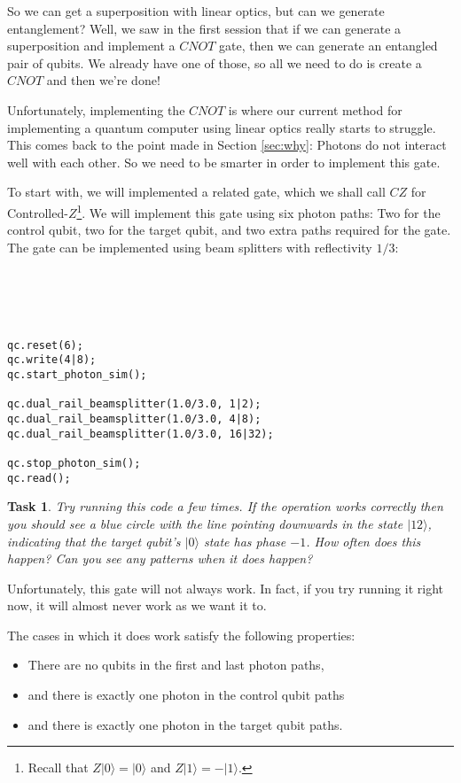 \documentclass[twocolumn]{article}
\newtheorem{task}{Task}[section]
\begin{document}
So we can get a superposition with linear optics, but can we generate entanglement? Well, we saw in the first session that if we can generate a superposition and implement a $CNOT$ gate, then we can generate an entangled pair of qubits. We already have one of those, so all we need to do is create a $CNOT$ and then we're done!

Unfortunately, implementing the $CNOT$ is where our current method for implementing a quantum computer using linear optics really starts to struggle. This comes back to the point made in Section \ref{sec:why}: Photons do not interact well with each other. So we need to be smarter in order to implement this gate.

To start with, we will implemented a related gate, which we shall call $CZ$ for Controlled-$Z$\footnote{Recall that $Z|0\rangle = |0\rangle$ and $Z|1\rangle = -|1\rangle$.}. We will implement this gate using six photon paths: Two for the control qubit, two for the target qubit, and two extra paths required for the gate. The gate can be implemented using beam splitters with reflectivity $1/3$:
\\\\\\\\\\
\begin{lstlisting}
qc.reset(6);
qc.write(4|8);
qc.start_photon_sim();

qc.dual_rail_beamsplitter(1.0/3.0, 1|2);
qc.dual_rail_beamsplitter(1.0/3.0, 4|8);
qc.dual_rail_beamsplitter(1.0/3.0, 16|32);

qc.stop_photon_sim();
qc.read();
\end{lstlisting}

\begin{task}
Try running this code a few times. If the operation works correctly then you should see a blue circle with the line pointing downwards in the state $|12\rangle$, indicating that the target qubit's $|0\rangle$ state has phase $-1$. How often does this happen? Can you see any patterns when it does happen?
\end{task}

Unfortunately, this gate will not always work. In fact, if you try running it right now, it will almost never work as we want it to.

The cases in which it does work satisfy the following properties:

\begin{itemize}
\item There are no qubits in the first and last photon paths,
\item and there is exactly one photon in the control qubit paths
\item and there is exactly one photon in the target qubit paths.
\end{itemize}
\end{document}
